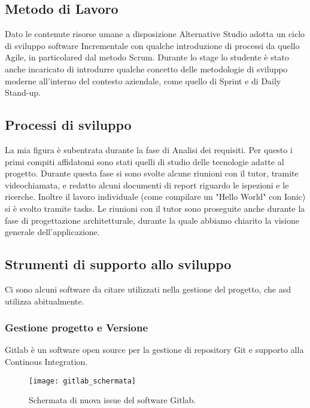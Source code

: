 \subsection{Metodo di Lavoro}
Dato le contenute risorse umane a disposizione Alternative Studio adotta un ciclo di sviluppo software \gls{Incrementale} con qualche
introduzione di processi da quello \gls{Agile}, in particolared dal metodo \gls{Scrum}. Durante lo stage lo studente è stato anche
incaricato di introdurre qualche concetto delle metodologie di sviluppo moderne all'interno del contesto aziendale, come quello di
\gls{Sprint} e di \gls{Daily Stand-up}.

\subsection{Processi di sviluppo}
La mia figura è subentrata durante la fase di Analisi dei requisiti. Per questo i primi compiti affidatomi sono stati quelli di studio delle
tecnologie adatte al progetto. Durante questa fase si sono svolte alcune riunioni con il tutor, tramite videochiamata,
e redatto alcuni documenti di report riguardo le ispezioni e le ricerche. Inoltre il lavoro individuale (come compilare un "Hello World" con Ionic) si è svolto
tramite tasks. Le riunioni con il tutor sono proseguite anche durante la fase di progettazione architetturale, durante la quale abbiamo
chiarito la visione generale dell'applicazione.

\subsection{Strumenti di supporto allo sviluppo}
Ci sono alcuni software da citare utilizzati nella gestione del progetto, che \acrlong{asd} utilizza abitualmente.

\subsubsection{Gestione progetto e Versione}
Gitlab è un software open source per la gestione di repository \gls{Git} e supporto alla Continous Integration.

\begin{figure}[htbp]
	\begin{center}
		\texttt{[image: gitlab\_schermata]}
	\end{center}
	\caption {Schermata di nuova issue del software Gitlab.}
\end{figure}

